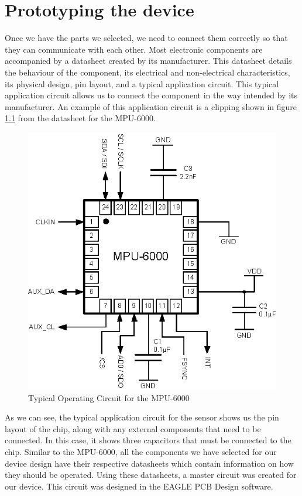 \chapter{Prototyping the device}
\label{Chap:Prototype}
Once we have the parts we selected,
we need to connect them correctly so that they can communicate with each other.
Most electronic components are accompanied by a datasheet created by its manufacturer.
This datasheet details the behaviour of the component,
its electrical and non-electrical characteristics,
its physical design,
pin layout,
and a typical application circuit.
This typical application circuit allows us to connect the component in the way intended by its manufacturer.
An example of this application circuit is a clipping shown in figure \ref{Fig:MPUAppCircuit} from the datasheet \cite{Datasheet:MPU6000} for the MPU-6000.
\begin{figure}
\begin{center}
\includegraphics{images/MPU600OpCircuit.eps}
\caption{Typical Operating Circuit for the MPU-6000}
\label{Fig:MPUAppCircuit}
\end{center}
\end{figure}
As we can see,
the typical application circuit for the sensor shows us the pin layout of the chip,
along with any external components that need to be connected.
In this case, it shows three capacitors that must be connected to the chip.
Similar to the MPU-6000,
all the components we have selected for our device design have their respective datasheets which contain information on how they should be operated.
Using these datasheets,
a master circuit was created for our device.
This circuit was designed in the EAGLE PCB Design software.

